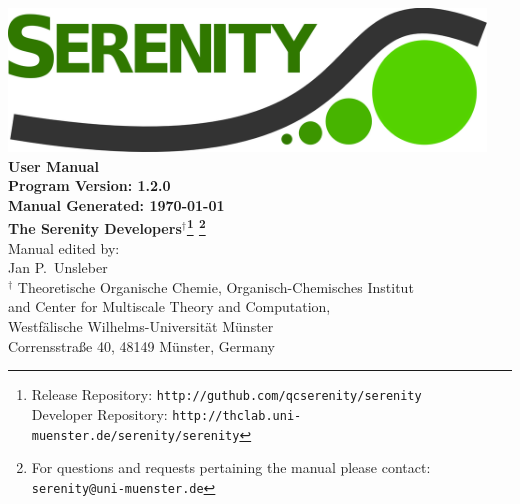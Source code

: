 \documentclass[bibliography=totocnumbered,a4paper,10pt]{scrartcl}
\begin{document}
\thispagestyle{empty}
\begin{center}
\vspace*{1cm}
\includegraphics[width=0.95\textwidth]{./figs/SerenityLogo.png}\\
\vspace{2cm}
{\LARGE\textbf{
User Manual
}}\\
\vspace{1cm}
{\large\textbf{
Program Version: 1.2.0\\
Manual Generated: \today
}}\\
\vspace{2cm}
{\large\textbf{ 
The Serenity Developers$^{\dagger}$\footnote{Release Repository: \texttt{http://guthub.com/qcserenity/serenity}\\
                                             Developer Repository: \texttt{http://thclab.uni-muenster.de/serenity/serenity}}
\footnote{For questions and requests pertaining the manual please contact:\\ \texttt{serenity@uni-muenster.de}}
}}\\
\vspace{2cm}
{\large Manual edited by: \\
Jan P.\ Unsleber
}
\\[2ex]

$^{\dagger}$ Theoretische Organische Chemie,
Organisch-Chemisches Institut \\
and Center for Multiscale Theory and Computation,\\
Westf\"alische Wilhelms-Universit\"at M\"unster\\
Corrensstra{\ss}e 40, 48149 M\"unster, Germany\\[2ex]

\vfill
\end{center}
\newpage
{}
\setcounter{page}{1}
\tableofcontents

\newpage
{}
\setcounter{page}{1}
\end{document}
